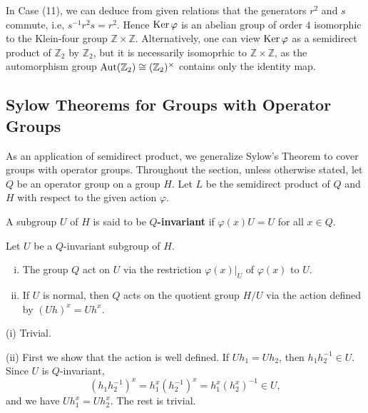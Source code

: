 \begin{remark}
	In Case (11), we can deduce from given relations that the generators $r^2$ and $s$ commute, i.e, $s^{-1}r^2s = r^2$. Hence $\operatorname{Ker}\varphi$ is an abelian group of order $4$ isomorphic to the Klein-four group $\mathbb{Z}\times \mathbb{Z}$. Alternatively, one can view $\operatorname{Ker} \varphi$ as a semidirect product of $\mathbb{Z}_2$ by $\mathbb{Z}_2$, but it is necessarily isomoprhic to $\mathbb{Z}\times \mathbb{Z}$, as the automorphism group $\operatorname{Aut}(\mathbb{Z}_2) \cong (\mathbb{Z}_2)^{\times}$ contains only the identity map.
\end{remark}



\subsection{Sylow Theorems for Groups with Operator Groups}
As an application of semidirect product, we generalize Sylow's Theorem to cover groups with operator groups. 
 Throughout the section, unless otherwise stated, let $Q$ be an operator group on a group $H$. Let $L$ be the semidirect product of $Q$ and $H$ with respect to the given action $\varphi$. 
\begin{definition}
	A subgroup $U$ of $H$ is said to be \textbf{$Q$-invariant} if $\varphi(x)U = U$ for all $x\in Q$.
\end{definition}
\begin{proposition} \label{prop-Q-act-on-invariant-subgroup}
	 Let $U$ be a $Q$-invariant subgroup of $H$. 
	\begin{enumerate}[(i)]
		\item The group $Q$ act on $U$ via  the restriction $\varphi(x)|_{U}$ of $\varphi(x)$ to $U$.
		\item If $U$ is normal, then $Q$ acts on the quotient group $H/U$ via the action defined by $(Uh)^x = Uh^x$.
	\end{enumerate}
	\begin{sketch}
		(i) Trivial.
		
		(ii) First we show that the action is well defined. If $Uh_1 = Uh_2$, then $h_1h_2^{-1} \in U$. Since $U$ is $Q$-invariant,
		$$(h_1h_2^{-1})^x = h_1^x(h_2^{-1})^x = h_1^x(h_2^x)^{-1} \in U,$$
		and we have $Uh_1^x = Uh_2^x$. %
		The rest is trivial.
	\end{sketch}
\end{proposition}
